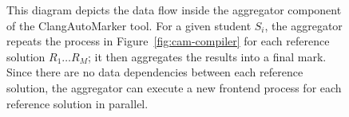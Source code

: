 \begin{figure}

\vspace*{0.5cm}
\caption[Aggregator Component of ClangAutoMarker]{This diagram depicts the data flow inside the aggregator component of the ClangAutoMarker tool. For a given student $S_i$, the aggregator repeats the process in Figure~\ref{fig:cam-compiler} for each reference solution $R_1 \ldots R_M$; it then aggregates the results into a final mark. Since there are no data dependencies between each reference solution, the aggregator can execute a new frontend process for each reference solution in parallel.}
\label{fig:cam-aggregator}
\end{figure}
